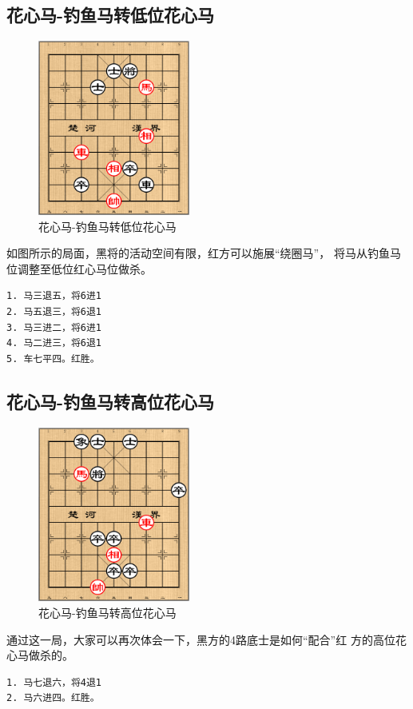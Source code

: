 \documentclass[a5paper,twoside]{book}
\begin{document}
\subsection{花心马-钓鱼马转低位花心马}
\label{sec-5-5-2}
\begin{figure}[H]
\centering
\includegraphics[width=5cm]{pic/花心马-钓鱼马转低位花心马.png}
\caption{花心马-钓鱼马转低位花心马}
\end{figure}

如图所示的局面，黑将的活动空间有限，红方可以施展“绕圈马”，
将马从钓鱼马位调整至低位红心马位做杀。

\begin{verbatim}
1. 马三退五，将6进1
2. 马五退三，将6退1
3. 马三进二，将6进1
4. 马二进三，将6退1
5. 车七平四。红胜。
\end{verbatim}
\subsection{花心马-钓鱼马转高位花心马}
\label{sec-5-5-3}
\begin{figure}[H]
\centering
\includegraphics[width=5cm]{pic/花心马-钓鱼马转高位花心马.png}
\caption{\label{hxm-dymzgwhxm}花心马-钓鱼马转高位花心马}
\end{figure}

通过这一局，大家可以再次体会一下，黑方的4路底士是如何“配合”红
方的高位花心马做杀的。

\begin{verbatim}
1. 马七退六，将4退1
2. 马六进四。红胜。
\end{verbatim}
\end{document}
